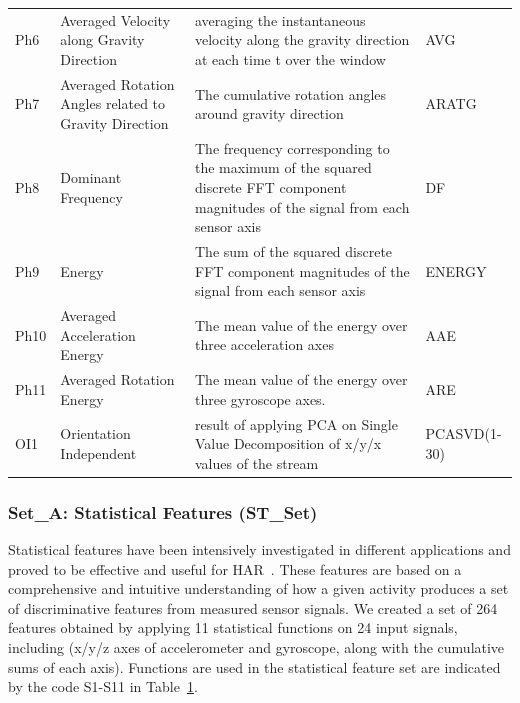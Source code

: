 \documentclass[journal,article,submit,moreauthors,pdftex]{Definitions/mdpi}
\begin{document}
\begin{table}[H]
\begin{tabular}{p{0.9cm}p{5cm}p{7cm}p{1.3cm}}
		Ph6&Averaged Velocity along Gravity Direction&{\scriptsize averaging the instantaneous velocity along the gravity direction at each time t over the window } & AVG \\
		Ph7&Averaged Rotation Angles related to Gravity Direction&{\scriptsize The cumulative rotation angles around gravity direction} & ARATG \\
		Ph8&Dominant Frequency&{\scriptsize The frequency corresponding to the maximum of the squared discrete FFT component magnitudes of the signal from each sensor axis} & DF \\
		Ph9&Energy&{\scriptsize The sum of the squared discrete FFT component magnitudes of the signal from each sensor axis} & ENERGY \\
		Ph10&Averaged Acceleration Energy&{\scriptsize The mean value of the energy over three acceleration axes} & AAE \\
		Ph11&Averaged Rotation Energy&{\scriptsize The mean value of the energy over three gyroscope axes. } & ARE \\
		OI1&Orientation Independent&{\scriptsize result of applying PCA on Single Value Decomposition  of x/y/x values of the stream } & PCASVD(1-30) \\
		\bottomrule
	\end{tabular}
	\label{features_table}
\end{table}


\subsubsection{Set\_A: Statistical Features (ST\_Set)}
Statistical features have been intensively investigated in different applications and proved to be effective and useful for HAR~\cite{rosati2018comparison}. These features are based on a comprehensive and intuitive understanding of how a given activity produces a set of discriminative features from measured sensor signals. We created a set of 264 features obtained by applying 11 statistical functions on 24 input signals, including (x/y/z axes of accelerometer and gyroscope, along with the cumulative sums of each axis). Functions are used in the statistical feature set are indicated by the code S1-S11 in Table~\ref{features_table}. 
\end{document}
